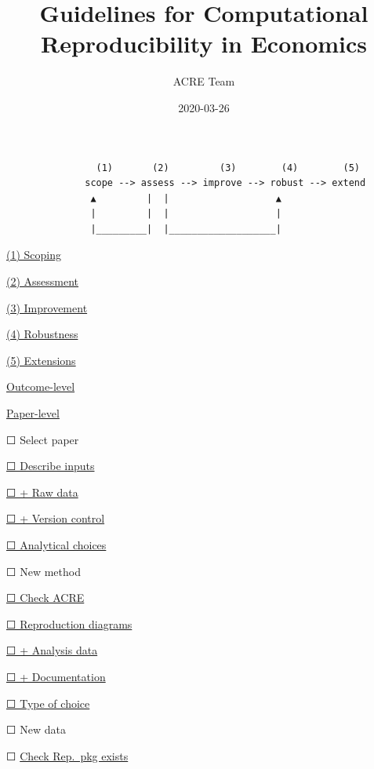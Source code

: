\documentclass[]{book}
\title{Guidelines for Computational Reproducibility in Economics}
\author{ACRE Team}
\date{2020-03-26}
\begin{document}
\maketitle

{
\setcounter{tocdepth}{1}
\tableofcontents
}
\hypertarget{section}{%
\chapter*{}\label{section}}

\begin{verbatim}
                (1)       (2)         (3)        (4)        (5)
              scope --> assess --> improve --> robust --> extend
               ▲         |  |                   ▲
               |         |  |                   |
               |_________|  |___________________|
\end{verbatim}

\protect\hyperlink{scoping}{(1) Scoping}

\protect\hyperlink{assessment}{(2) Assessment}

\protect\hyperlink{improvements}{(3) Improvement}

\protect\hyperlink{robust}{(4) Robustness}

\href{}{(5) Extensions}

\protect\hyperlink{improvements}{Outcome-level}

\protect\hyperlink{paper-level}{Paper-level}

☐ Select paper

\protect\hyperlink{describe-inputs}{☐ Describe inputs}

\protect\hyperlink{rd}{☐ + Raw data}

\protect\hyperlink{paper-level}{☐ + Version control}

\protect\hyperlink{id-analy}{☐ Analytical choices}

☐ New method

\protect\hyperlink{check-acre}{☐ Check ACRE}

\protect\hyperlink{diagram}{☐ Reproduction diagrams}

\protect\hyperlink{ad}{☐ + Analysis data}

\protect\hyperlink{paper-level}{☐ + Documentation}

\protect\hyperlink{id-type}{☐ Type of choice}

☐ New data

☐ \protect\hyperlink{verify-rep-mat}{Check Rep.~pkg exists}
\end{document}
